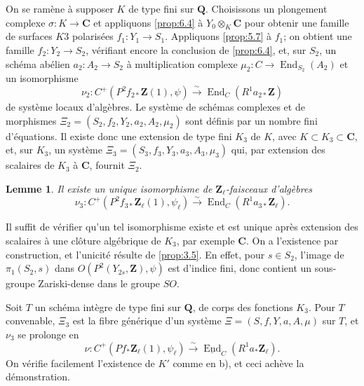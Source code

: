 \documentclass[11pt]{amsart}
\theoremstyle{plain}
\newtheorem{lemme}[theoreme]{Lemme}
\theoremstyle{definition}
\theoremstyle{remark}
\begin{document}
On se ram\`ene \`a supposer $K$ de type fini sur $\mathbf{Q}$. Choisissons un plongement complexe $\sigma\colon K\to\mathbf{C}$ et appliquons \ref{prop:6.4} \`a $Y_0\otimes_K\mathbf{C}$ pour obtenir une famille de surfaces $K3$ polaris\'ees $f_1\colon Y_1\to S_1$. Appliquons \ref{prop:5.7} \`a $f_1$; on obtient une famille $f_2\colon Y_2\to S_2$, v\'erifiant encore la conclusion de \ref{prop:6.4}, et, sur $S_2$, un sch\'ema ab\'elien $a_2\colon A_2\to S_2$ \`a multiplication complexe $\mu_2\colon C\to\operatorname{End}_{S_2}(A_2)$ et un isomorphisme
\begin{equation*}
\nu_2\colon C^+(P^2f_{2*}\mathbf{Z}(1),\psi)\xrightarrow{\sim}\operatorname{End}_C(R^1a_{2*}\mathbf{Z})
\end{equation*}
de syst\`eme locaux d'alg\`ebres. Le syst\`eme de sch\'emas complexes et de morphismes $\Xi_2=(S_2,f_2,Y_2,a_2,A_2,\mu_2)$ sont d\'efinis par un nombre fini d'\'equations. Il existe donc une extension de type fini $K_3$ de $K$, avec $K\subset K_3\subset\mathbf{C}$, et, sur $K_3$, un syst\`eme $\Xi_3=(S_3,f_3,Y_3,a_3,A_3,\mu_3)$ qui, par extension des scalaires de $K_3$ \`a $\mathbf{C}$, fournit $\Xi_2$.

\begin{lemme}
Il existe un unique isomorphisme de $\mathbf{Z}_\ell$-faisceaux d'alg\`ebres
\begin{equation*}
\nu_3\colon C^+(P^2f_{3*}\mathbf{Z}_\ell(1),\psi_\ell)\xrightarrow{\sim}\operatorname{End}_C(R^1a_{3*}\mathbf{Z}_\ell).
\end{equation*}
\end{lemme}

Il suffit de v\'erifier qu'un tel isomorphisme existe et est unique apr\`es extension des scalaires \`a une cl\^oture alg\'ebrique de $K_3$, par exemple $\mathbf{C}$. On a l'existence par construction, et l'unicit\'e r\'esulte de \ref{prop:3.5}. En effet, pour $s\in S_2$, l'image de $\pi_1(S_2,s)$ dans $O(P^2(Y_{2s},\mathbf{Z}),\psi)$ est d'indice fini, donc contient un sous-groupe Zariski-dense dans le groupe $SO$.

Soit $T$ un sch\'ema int\`egre de type fini sur $\mathbf{Q}$, de corps des fonctions $K_3$. Pour $T$ convenable, $\Xi_3$ est la fibre g\'en\'erique d'un syst\`eme $\Xi=(S,f,Y,a,A,\mu)$ sur $T$, et $\nu_3$ se prolonge en
\begin{equation*}
\nu\colon C^+(Pf_*\mathbf{Z}_\ell(1),\psi_\ell)\xrightarrow{\sim}\underline{\operatorname{End}}_C(R^1a_*\mathbf{Z}_\ell).
\end{equation*}
On v\'erifie facilement l'existence de $K'$ comme en b), et ceci ach\`eve la d\'emonstration.
\end{document}
